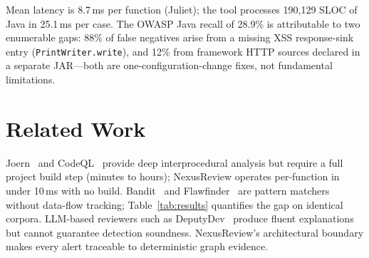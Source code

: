 \documentclass[10pt,conference]{IEEEtran}
\begin{document}
\begin{table}[t]
\centering
\caption{NexusReview evaluation summary (case level).}
\label{tab:results}
\end{table}

Mean latency is 8.7\,ms per function (Juliet); the tool processes
190{,}129 SLOC of Java in 25.1\,ms per case. The OWASP Java recall of
28.9\% is attributable to two enumerable gaps: 88\% of false negatives
arise from a missing XSS response-sink entry (\texttt{PrintWriter.write}),
and 12\% from framework HTTP sources declared in a separate JAR---both
are one-configuration-change fixes, not fundamental limitations.

\section{Related Work}

Joern~\cite{joern2014} and CodeQL~\cite{codeql2020} provide deep
interprocedural analysis but require a full project build step (minutes
to hours); NexusReview operates per-function in under 10\,ms with no
build. Bandit~\cite{bandit} and Flawfinder~\cite{flawfinder} are
pattern matchers without data-flow tracking; Table~\ref{tab:results}
quantifies the gap on identical corpora. LLM-based reviewers such as
DeputyDev~\cite{deputydev} produce fluent explanations but cannot
guarantee detection soundness. NexusReview's architectural boundary
makes every alert traceable to deterministic graph evidence.
\end{document}
